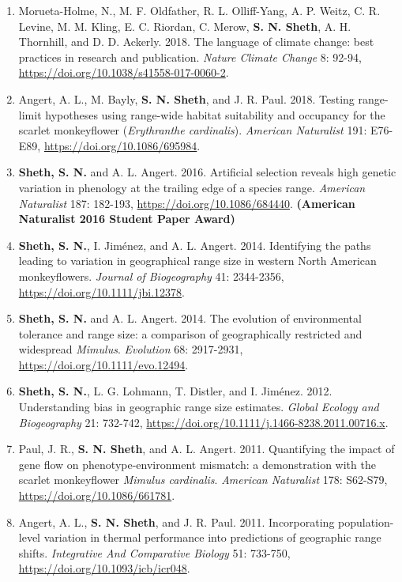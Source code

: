 \documentclass[11pt,english]{article}\usepackage[]{graphicx}\usepackage[]{xcolor}
\begin{document}
\begin{hangparas}{.5in}{1}
\begin{enumerate}
\item Morueta-Holme, N., M. F. Oldfather, R. L. Olliff-Yang, A. P. Weitz, C. R. Levine, M. M. Kling, E. C. Riordan, C. Merow, \textbf{S. N. Sheth}, A. H. Thornhill, and D. D. Ackerly. 2018. The language of climate change: best practices in research and publication. \emph{Nature Climate Change} 8: 92-94, \url{https://doi.org/10.1038/s41558-017-0060-2}.

\item Angert, A. L., M. Bayly, \textbf{S. N. Sheth}, and J. R. Paul. 2018. Testing range-limit hypotheses using range-wide habitat suitability and occupancy for the scarlet monkeyflower (\textit{Erythranthe cardinalis}). \emph{American Naturalist} 191: E76-E89, \url{https://doi.org/10.1086/695984}.

 \item \textbf{Sheth, S. N.} and A. L. Angert. 2016. Artificial selection reveals high genetic variation in phenology at the trailing edge of a species range. \emph{American Naturalist} 187: 182-193, \url{https://doi.org/10.1086/684440}. \textbf{(American Naturalist 2016 Student Paper Award)} 
 
\item \textbf{Sheth, S. N.}, I. Jim\'enez, and A. L. Angert. 2014. Identifying the paths leading to variation in geographical range size in western North American monkeyflowers. \emph{Journal of Biogeography} 41: 2344-2356, \url{https://doi.org/10.1111/jbi.12378}. 
\item \textbf{Sheth, S. N.} and A. L. Angert. 2014. The evolution of environmental tolerance and range size: a comparison of geographically restricted and widespread \textit{Mimulus}. \emph{Evolution} 68: 2917-2931, \url{https://doi.org/10.1111/evo.12494}. 

\item \textbf{Sheth, S. N.}, L. G. Lohmann, T. Distler, and I. Jim\'enez. 2012. Understanding bias in geographic range size estimates. \emph{Global Ecology and Biogeography} 21: 732-742, \url{https://doi.org/10.1111/j.1466-8238.2011.00716.x}.
 
 \item Paul, J. R., \textbf{S. N. Sheth}, and A. L. Angert. 2011. Quantifying the impact of gene flow on phenotype-environment mismatch: a demonstration with the scarlet monkeyflower \textit{Mimulus cardinalis}. \emph{American Naturalist} 178: S62-S79, \url{https://doi.org/10.1086/661781}. 
 
\item Angert, A. L., \textbf{S. N. Sheth}, and J. R. Paul. 2011. Incorporating population-level variation in thermal performance into predictions of geographic range shifts. \emph{Integrative And Comparative Biology} 51: 733-750, \url{https://doi.org/10.1093/icb/icr048}. 


\end{enumerate}
\end{hangparas}
\end{document}
